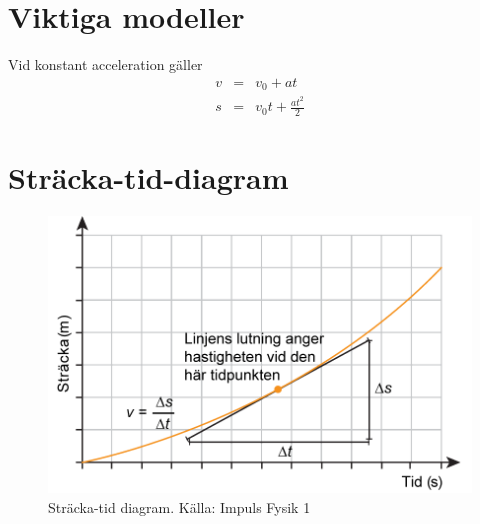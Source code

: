 \documentclass[11pt]{article}
\begin{document}
\section{Viktiga modeller}
Vid konstant acceleration gäller
\begin{eqnarray}
v&=&v_0+at \\
s&=&v_0 t +  \frac{at^2}{2}
\end{eqnarray}
\section{Sträcka-tid-diagram}
\begin{figure}[!h]
\includegraphics[width=\textwidth]{images/chapter3/DistTime.png}
\caption{Sträcka-tid diagram. Källa: Impuls Fysik 1}
\end{figure}
\clearpage
\end{document}
